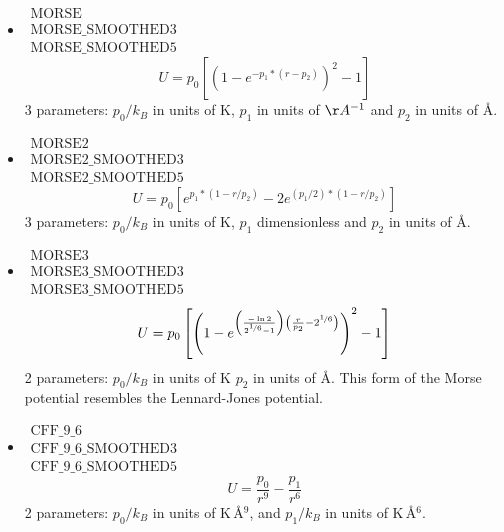 \begin{itemize}
\item{$\begin{array}{l}\text{MORSE}\\
      \text{MORSE\_SMOOTHED3}\\
      \text{MORSE\_SMOOTHED5}\end{array}$}\\
  \begin{equation}
    U= p_0 \left[(1-{e^{-p_1*(r-p_2)}})^2-1\right]
  \end{equation}
   3 parameters: $p_0/k_B$ in units of K, $p_1$ in units of $\AA^{-1}$ and $p_2$ in units of \AA.

\item{$\begin{array}{l}\text{MORSE2}\\
      \text{MORSE2\_SMOOTHED3}\\
      \text{MORSE2\_SMOOTHED5}\end{array}$}\\
  \begin{equation}
    U= p_0 \left[e^{p_1*(1-r/p_2)}-2e^{(p_1/2)*(1-r/p_2)}\right]
  \end{equation}
   3 parameters: $p_0/k_B$ in units of K, $p_1$ dimensionless and $p_2$ in units of \AA.

\item{$\begin{array}{l}\text{MORSE3}\\
      \text{MORSE3\_SMOOTHED3}\\
      \text{MORSE3\_SMOOTHED5}\end{array}$}\\
  \begin{equation}
    U= p_0 \left[\left(1-e^{\left(\frac{-\ln{2}}{2^{\nicefrac{1}{6}}-1}\right)\left(\frac{r}{p_2}-2^{\nicefrac{1}{6}}\right)}\right)^2-1\right]
  \end{equation}
   2 parameters: $p_0/k_B$ in units of K $p_2$ in units of \AA. This form of the Morse potential resembles the Lennard-Jones potential.

\item{$\begin{array}{l}\text{CFF\_9\_6}\\
      \text{CFF\_9\_6\_SMOOTHED3}\\
      \text{CFF\_9\_6\_SMOOTHED5}\end{array}$}\\
  \begin{equation}
    U= 
      \frac{p_0}{r^{9}}-\frac{p_1}{r^6}
  \end{equation}
   2 parameters: $p_0/k_B$ in units of K\,\AA$^{9}$, and $p_1/k_B$ in units of K\,\AA$^6$.


\end{itemize}
